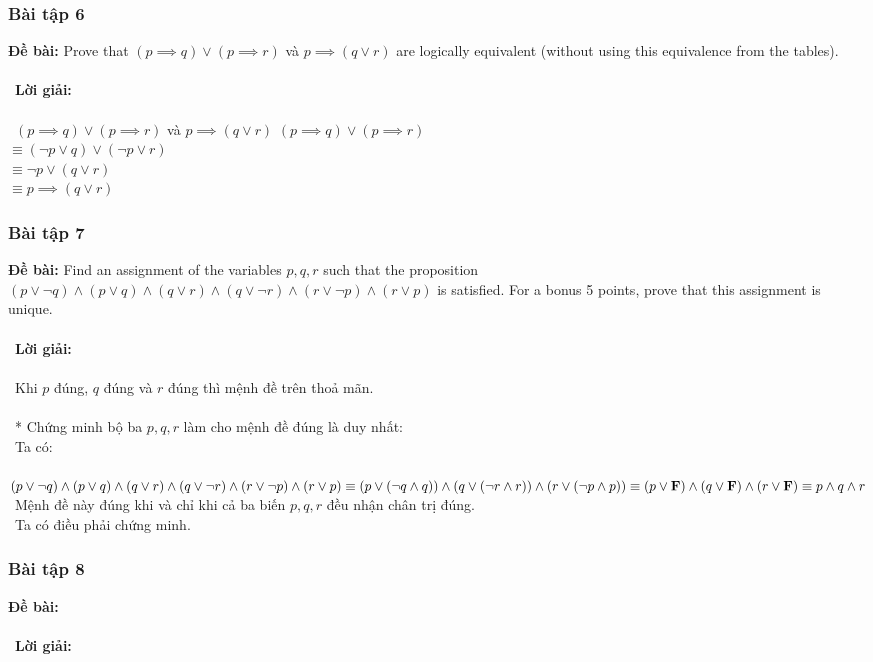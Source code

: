 \documentclass[a4paper]{article}
\begin{document}
\subsubsection{Bài tập 6} 
\textbf{Đề bài:} Prove that $(p \implies q) \lor (p \implies r)$ và $p \implies (q \lor r)$ are logically equivalent (without using
this equivalence from the tables).
\\\ \\\
\textbf{Lời giải:} \\\ \\\
$(p \implies q) \lor (p \implies r)$ và $p \implies (q \lor r)$
$(p \implies q) \lor (p \implies r)$\\
$\equiv (\lnot p \lor q) \lor (\lnot p \lor r)$\\
$\equiv \lnot p \lor (q \lor r)$\\
$\equiv p \implies (q \lor r)$\\
\clearpage
\subsubsection{Bài tập 7}
\textbf{Đề bài: }Find an assignment of the variables $p, q, r$ such that the proposition $(p \lor \lnot q) \land (p \lor q) \land (q \lor r) \land (q \lor \lnot r) \land (r \lor \lnot p) \land (r \lor p)$ is satisfied. For a bonus 5 points, prove that this assignment is unique. \\\ \\\
\textbf{Lời giải:} \\\ \\\
Khi $p$ đúng, $q$ đúng và $r$ đúng thì mệnh đề trên thoả mãn. \\\ \\\
* Chứng minh bộ ba $p,q,r$ làm cho mệnh đề đúng là duy nhất: \\\
Ta có: \\\
$(p \lor \lnot q) \land (p \lor q) \land (q \lor r) \land (q \lor \lnot r) \land (r \lor \lnot p) \land (r \lor p) \\\equiv  (p \lor (\lnot q \land q)) \land (q \lor (\lnot r \land r)) \land (r \lor (\lnot p \land p))\\\equiv (p \lor \textbf{F}) \land (q \lor \textbf{F}) \land (r \lor \textbf{F}) \\\equiv p \land q \land r$ \\\
Mệnh đề này đúng khi và chỉ khi cả ba biến $p,q,r$ đều nhận chân trị đúng. \\\
Ta có điều phải chứng minh.
\clearpage
\subsubsection{Bài tập 8}
\textbf{Đề bài:} 
\\\ \\\
\textbf{Lời giải:} \\\ \\\
\clearpage
\end{document}
